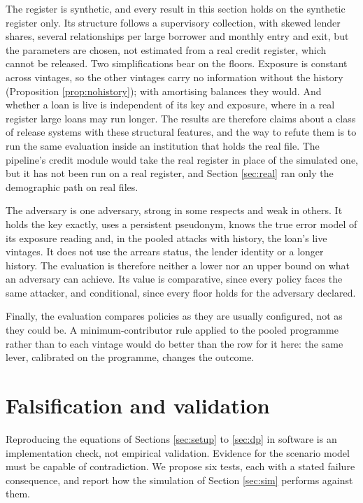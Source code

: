 \documentclass[11pt,a4paper]{article}
\theoremstyle{plain}
\theoremstyle{definition}
\theoremstyle{definition}
\theoremstyle{plain}
\begin{document}
The register is synthetic, and every result in this section holds on the
synthetic register only. Its structure follows a supervisory collection, with
skewed lender shares, several relationships per large borrower and monthly entry and
exit, but the parameters are chosen, not estimated from a real credit register,
which cannot be released. Two simplifications bear on the floors. Exposure is
constant across vintages, so the other vintages carry no information without the
history (Proposition \ref{prop:nohistory}); with amortising balances they would.
And whether a loan is live is independent of its key and exposure, where in a
real register large loans may run longer. The results are therefore claims about
a class of release systems with these structural features, and the way to refute
them is to run the same evaluation inside an institution that holds the real
file. The pipeline's credit module would take the real register in place of the
simulated one, but it has not been run on a real register, and Section
\ref{sec:real} ran only the demographic path on real files.

The adversary is one adversary, strong in some respects and weak in others. It
holds the key exactly, uses a persistent pseudonym, knows the true error model of
its exposure reading and, in the pooled attacks with history, the loan's live
vintages. It does not use the arrears status, the lender identity or a longer
history. The evaluation is therefore neither a lower nor an upper bound on what an
adversary can achieve. Its value is comparative, since every policy faces the same
attacker, and conditional, since every floor holds for the adversary declared.

Finally, the evaluation compares policies as they are usually configured, not as
they could be. A minimum-contributor rule applied to the pooled programme rather
than to each vintage would do better than the row for it here: the same lever,
calibrated on the programme, changes the outcome.


\section{Falsification and validation}\label{sec:falsify}

Reproducing the equations of Sections \ref{sec:setup} to \ref{sec:dp} in
software is an implementation check, not empirical validation. Evidence for the
scenario model must be capable of contradiction. We propose six tests, each
with a stated failure consequence, and report how the simulation of Section
\ref{sec:sim} performs against them.
\end{document}
